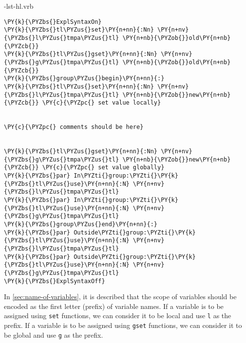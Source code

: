 \documentclass{ltugboat}
\begin{document}
\begin{filecontents}{\jobname-lst-hl.vrb}
\begin{Verbatim}[commandchars=\\\{\}]
\PY{k}{\PYZbs{}ExplSyntaxOn}
\PY{k}{\PYZbs{}tl\PYZus{}set}\PY{n+nn}{:Nn} \PY{n+nv}{\PYZbs{}l\PYZus{}tmpa\PYZus{}tl} \PY{n+nb}{\PYZob{}}old\PY{n+nb}{\PYZcb{}}
\PY{k}{\PYZbs{}tl\PYZus{}gset}\PY{n+nn}{:Nn} \PY{n+nv}{\PYZbs{}g\PYZus{}tmpa\PYZus{}tl} \PY{n+nb}{\PYZob{}}old\PY{n+nb}{\PYZcb{}}
\PY{k}{\PYZbs{}group\PYZus{}begin}\PY{n+nn}{:}
\PY{k}{\PYZbs{}tl\PYZus{}set}\PY{n+nn}{:Nn} \PY{n+nv}{\PYZbs{}l\PYZus{}tmpa\PYZus{}tl} \PY{n+nb}{\PYZob{}}new\PY{n+nb}{\PYZcb{}} \PY{c}{\PYZpc{} set value locally}


\PY{c}{\PYZpc{} comments should be here}


\PY{k}{\PYZbs{}tl\PYZus{}gset}\PY{n+nn}{:Nn} \PY{n+nv}{\PYZbs{}g\PYZus{}tmpa\PYZus{}tl} \PY{n+nb}{\PYZob{}}new\PY{n+nb}{\PYZcb{}} \PY{c}{\PYZpc{} set value globally}
\PY{k}{\PYZbs{}par} In\PYZti{}group:\PYZti{}\PY{k}{\PYZbs{}tl\PYZus{}use}\PY{n+nn}{:N} \PY{n+nv}{\PYZbs{}l\PYZus{}tmpa\PYZus{}tl}
\PY{k}{\PYZbs{}par} In\PYZti{}group:\PYZti{}\PY{k}{\PYZbs{}tl\PYZus{}use}\PY{n+nn}{:N} \PY{n+nv}{\PYZbs{}g\PYZus{}tmpa\PYZus{}tl}
\PY{k}{\PYZbs{}group\PYZus{}end}\PY{n+nn}{:}
\PY{k}{\PYZbs{}par} Outside\PYZti{}group:\PYZti{}\PY{k}{\PYZbs{}tl\PYZus{}use}\PY{n+nn}{:N} \PY{n+nv}{\PYZbs{}l\PYZus{}tmpa\PYZus{}tl}
\PY{k}{\PYZbs{}par} Outside\PYZti{}group:\PYZti{}\PY{k}{\PYZbs{}tl\PYZus{}use}\PY{n+nn}{:N} \PY{n+nv}{\PYZbs{}g\PYZus{}tmpa\PYZus{}tl}
\PY{k}{\PYZbs{}ExplSyntaxOff}
\end{Verbatim}
\end{filecontents}
In \cref{sec:name-of-variables}, it is described that the scope of variables should be encoded as the first letter (prefix) of variable names.
If a variable is to be assigned using \verb|set| functions, we can consider it to be local and use \verb|l| as the prefix.
If a variable is to be assigned using \verb|gset| functions, we can consider it to be global and use \verb|g| as the prefix.


\makesignature
\end{document}
